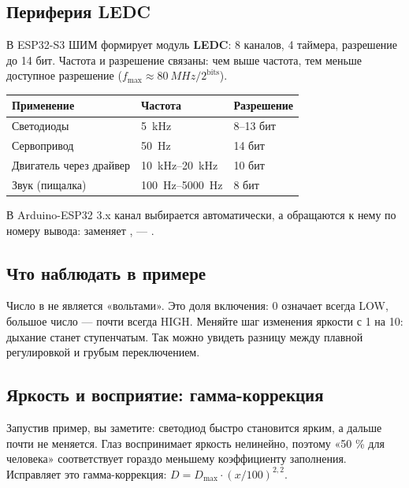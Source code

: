 \subsection{Периферия LEDC}

В ESP32-S3 ШИМ формирует модуль \textbf{LEDC}: 8 каналов, 4 таймера, разрешение до 14 бит.
Частота и разрешение связаны: чем выше частота, тем меньше доступное разрешение
($f_\text{max} \approx \SI{80}{MHz}/2^{\text{bits}}$).

\begin{center}\small
\begin{tabular}{@{}lll@{}}
\toprule
Применение & Частота & Разрешение \\
\midrule
Светодиоды & \SI{5}{kHz} & 8--13 бит \\
Сервопривод & \SI{50}{Hz} & 14 бит \\
Двигатель через драйвер & \SIrange{10}{20}{kHz} & 10 бит \\
Звук (пищалка) & \SIrange{100}{5000}{Hz} & 8 бит \\
\bottomrule
\end{tabular}
\end{center}

В Arduino-ESP32 3.x канал выбирается автоматически, а обращаются к нему по номеру вывода:
 заменяет ,  ---
.


\subsection{Что наблюдать в примере}

Число в  не является «вольтами». Это доля включения: 0 означает всегда LOW, большое
число --- почти всегда HIGH. Меняйте шаг изменения яркости с 1 на 10: дыхание станет ступенчатым.
Так можно увидеть разницу между плавной регулировкой и грубым переключением.

\subsection{Яркость и восприятие: гамма-коррекция}

Запустив пример, вы заметите: светодиод быстро становится ярким, а дальше почти не меняется. Глаз
воспринимает яркость нелинейно, поэтому «50 \% для человека» соответствует гораздо меньшему
коэффициенту заполнения. Исправляет это гамма-коррекция: $D = D_\text{max}\cdot(x/100)^{2{,}2}$.


